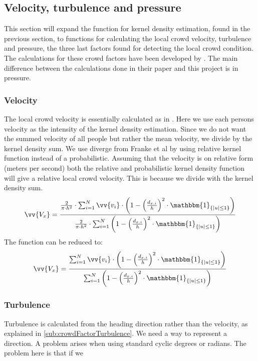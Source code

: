 
\subsection{Velocity, turbulence and pressure}
This section will expand the function for kernel density estimation, found in the previous section, to functions for calculating the local crowd velocity, turbulence and pressure, the three last factors found for detecting the local crowd condition. The calculations for these crowd factors have been developed by \citet{wirz2012inferring}. The main difference between the calculations done in their paper and this project is in pressure. 

\subsubsection{Velocity}
The local crowd velocity is essentially calculated as in \citet{wirz2012inferring}. Here we use each persons velocity as the intensity of the kernel density estimation. Since we do not want the summed velocity of all people but rather the mean velocity, we divide by the kernel density sum. We use diverge from Franke et al by using relative kernel function instead of a probabilistic. Assuming that the velocity is on relative form (meters per second) both the relative and probabilistic kernel density function will give a relative local crowd velocity. This is because we divide with the kernel density sum. 
\begin{equation}
\label{eq:}
\vv{V_x} = \frac{\frac{2}{\pi \cdot h^2} \cdot \sum_{i=1}^N \vv{v_i} \cdot \left(1-\left(\frac{d_{x,i}}{h}\right)^2 \cdot \mathbbm{1}_{\{|u| \leq 1\} }\right)}{\frac{2}{\pi \cdot h^2} \cdot \sum_{i=1}^N \left(1-\left(\frac{d_{x,i}}{h}\right)^2 \cdot \mathbbm{1}_{\{|u| \leq 1\} }\right)}
\end{equation}
The function can be reduced to:
\begin{equation}
\label{eq:}
\vv{V_x} = \frac{\sum_{i=1}^N \vv{v_i} \cdot \left(1-\left(\frac{d_{x,i}}{h}\right)^2 \cdot \mathbbm{1}_{\{|u| \leq 1\} }\right)}{\sum_{i=1}^N \left(1-\left(\frac{d_{x,i}}{h}\right)^2 \cdot \mathbbm{1}_{\{|u| \leq 1\} }\right)}
\end{equation}

\subsubsection{Turbulence}
Turbulence is calculated from the heading direction rather than the velocity, as explained in \cref{sub:crowdFactorTurbulence}. We need a way to represent a direction. A problem arises when using standard cyclic degrees or radians. The problem here is that if we 

